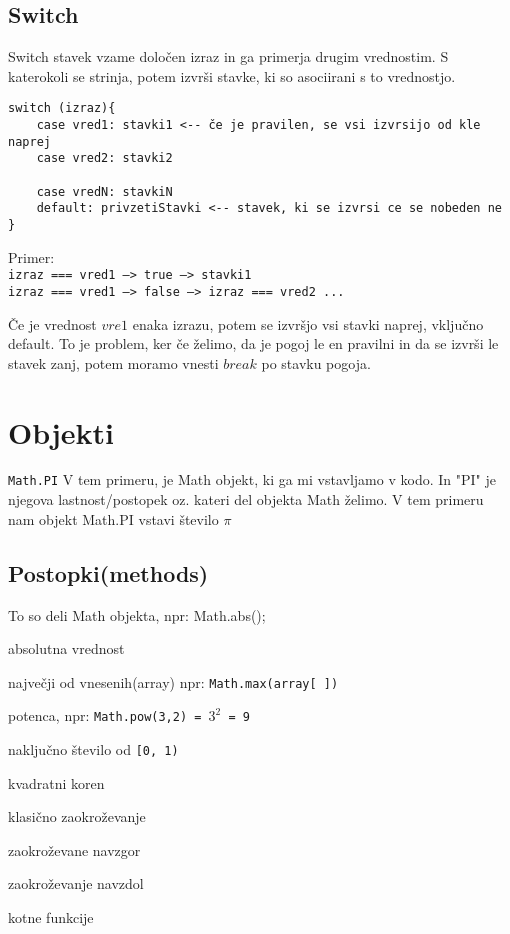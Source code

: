 \subsection{Switch}
Switch stavek vzame določen izraz in ga primerja drugim vrednostim. S katerokoli se strinja, potem izvrši stavke, ki so asociirani s to vrednostjo.
\begin{verbatim}
switch (izraz){
    case vred1: stavki1 <-- če je pravilen, se vsi izvrsijo od kle naprej
    case vred2: stavki2
    
    case vredN: stavkiN
    default: privzetiStavki <-- stavek, ki se izvrsi ce se nobeden ne
}
\end{verbatim}
Primer:\\
\texttt{izraz === vred1 --> true --> stavki1}\\
\texttt{izraz === vred1 --> false --> izraz === vred2 ...}

Če je vrednost $vre1$ enaka izrazu, potem se izvršjo vsi stavki naprej, vključno default. To je problem, ker če želimo, da je pogoj le en pravilni in da se izvrši le stavek zanj, potem moramo vnesti $break$ po stavku pogoja.
\newpage
\section{Objekti}

\texttt{Math.PI}
V tem primeru, je Math objekt, ki ga mi vstavljamo v kodo. In "PI" je njegova lastnost/postopek oz. kateri del objekta Math želimo. V tem primeru nam objekt Math.PI vstavi število $\pi$


\subsection{Postopki(methods)}
To so deli Math objekta, npr: Math.abs();
\begin{description}[align=left, labelwidth=2cm]
	\item[abs()] absolutna vrednost
	\item[max()] največji od vnesenih(array) npr: \texttt{Math.max(array[ ])}
	\item[pow()] potenca, npr: \texttt{Math.pow(3,2) = $3^2$ = 9}
	
	\item[random()] naključno število od \texttt{[0, 1)}
	\item[sqrt()] kvadratni koren
	\item[round()] klasično zaokroževanje
	\item[ceil()] zaokroževane navzgor
	\item[floor()] zaokroževanje navzdol
	\item[sin(), cos(), tan()] kotne funkcije
\end{description}

